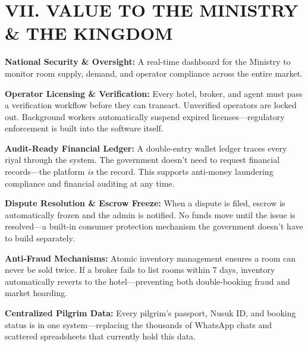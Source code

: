 \documentclass[11pt,a4paper]{article}
\begin{document}
\vspace{0.3cm}

\section*{VII. VALUE TO THE MINISTRY \& THE KINGDOM}

\textbf{National Security \& Oversight:} A real-time dashboard for the Ministry to monitor room supply, demand, and operator compliance across the entire market.

\vspace{0.3cm}

\textbf{Operator Licensing \& Verification:} Every hotel, broker, and agent must pass a verification workflow before they can transact. Unverified operators are locked out. Background workers automatically suspend expired licenses---regulatory enforcement is built into the software itself.

\vspace{0.3cm}

\textbf{Audit-Ready Financial Ledger:} A double-entry wallet ledger traces every riyal through the system. The government doesn't need to request financial records---the platform \textit{is} the record. This supports anti-money laundering compliance and financial auditing at any time.

\vspace{0.3cm}

\textbf{Dispute Resolution \& Escrow Freeze:} When a dispute is filed, escrow is automatically frozen and the admin is notified. No funds move until the issue is resolved---a built-in consumer protection mechanism the government doesn't have to build separately.

\vspace{0.3cm}

\textbf{Anti-Fraud Mechanisms:} Atomic inventory management ensures a room can never be sold twice. If a broker fails to list rooms within 7 days, inventory automatically reverts to the hotel---preventing both double-booking fraud and market hoarding.

\vspace{0.3cm}

\textbf{Centralized Pilgrim Data:} Every pilgrim's passport, Nusuk ID, and booking status is in one system---replacing the thousands of WhatsApp chats and scattered spreadsheets that currently hold this data.

\vspace{0.3cm}
\end{document}

